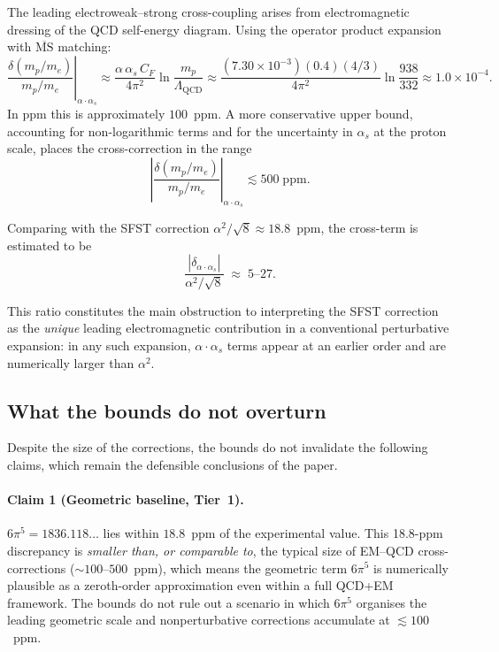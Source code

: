 The leading electroweak--strong cross-coupling arises from
electromagnetic dressing of the QCD self-energy diagram.  Using the
operator product expansion with $\overline{\mathrm{MS}}$ matching:
\begin{equation}
  \label{eq:crossTerm}
  \left.\frac{\delta(m_p/m_e)}{m_p/m_e}\right|_{\alpha\cdot\alpha_s}
  \approx \frac{\alpha\,\alpha_s\,C_F}{4\pi^2}
          \ln\!\frac{m_p}{\Lambda_{\mathrm{QCD}}}
  \approx \frac{(7.30\times10^{-3})(0.4)(4/3)}{4\pi^2}
          \ln\!\frac{938}{332}
  \approx 1.0\times10^{-4}.
\end{equation}
In ppm this is approximately $100$~ppm.  A more conservative upper
bound, accounting for non-logarithmic terms and for the uncertainty
in $\alpha_s$ at the proton scale, places the cross-correction in the
range
\begin{equation}
  \label{eq:crossBound}
  \left|\frac{\delta(m_p/m_e)}{m_p/m_e}\right|_{\alpha\cdot\alpha_s}
  \lesssim 500\;\mathrm{ppm}.
\end{equation}

Comparing with the SFST correction $\alpha^2/\sqrt{8}\approx 18.8$~ppm,
the cross-term is estimated to be
\begin{equation}
  \frac{|\delta_{\alpha\cdot\alpha_s}|}{\alpha^2/\sqrt{8}}
  \;\approx\; 5\text{--}27.
\end{equation}

This ratio constitutes the main obstruction to interpreting the SFST
correction as the \emph{unique} leading electromagnetic contribution
in a conventional perturbative expansion: in any such expansion,
$\alpha\cdot\alpha_s$ terms appear at an earlier order and are
numerically larger than $\alpha^2$.

\subsection{What the bounds do not overturn}
\label{ssec:compatible}

Despite the size of the corrections, the bounds do not invalidate the
following claims, which remain the defensible conclusions of the paper.

\paragraph{Claim 1 (Geometric baseline, Tier~1).}
$6\pi^5 = 1836.118\ldots$ lies within $18.8$~ppm of the experimental
value.  This 18.8-ppm discrepancy is \emph{smaller than, or
comparable to}, the typical size of EM--QCD cross-corrections
($\sim 100$--$500$~ppm), which means the geometric term $6\pi^5$ is
numerically plausible as a zeroth-order approximation even within a
full QCD+EM framework.  The bounds do not rule out a scenario in which
$6\pi^5$ organises the leading geometric scale and
nonperturbative corrections accumulate at $\lesssim 100$~ppm.

